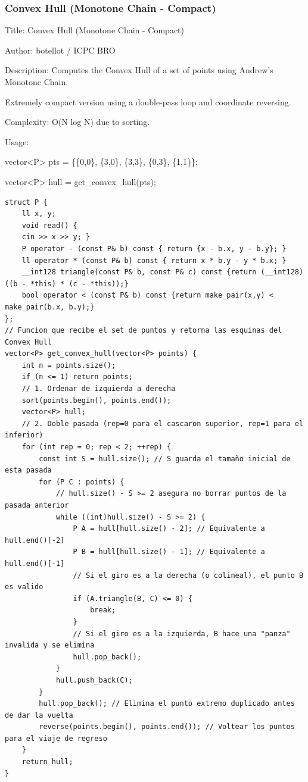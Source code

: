 \documentclass[10pt,landscape,twocolumn]{article}
\begin{document}
\subsubsection{Convex Hull (Monotone Chain - Compact)}
\begin{flushleft}
\footnotesize\ttfamily
\par\noindent Title: Convex Hull (Monotone Chain - Compact)
\par\noindent Author: botellot / ICPC BRO
\par\noindent Description: Computes the Convex Hull of a set of points using Andrew's Monotone Chain.
\par\noindent Extremely compact version using a double-pass loop and coordinate reversing.
\par\noindent Complexity: O(N log N) due to sorting.
\par\noindent Usage:
\par\noindent vector\textless{}P\textgreater{} pts = \{\{0,0\}, \{3,0\}, \{3,3\}, \{0,3\}, \{1,1\}\};
\par\noindent vector\textless{}P\textgreater{} hull = get\_convex\_hull(pts);
\end{flushleft}

\begin{lstlisting}
struct P {
    ll x, y;
    void read() { 
    cin >> x >> y; }
    P operator - (const P& b) const { return {x - b.x, y - b.y}; }
    ll operator * (const P& b) const { return x * b.y - y * b.x; }
    __int128 triangle(const P& b, const P& c) const {return (__int128)((b - *this) * (c - *this));}
    bool operator < (const P& b) const {return make_pair(x,y) < make_pair(b.x, b.y);}
};
// Funcion que recibe el set de puntos y retorna las esquinas del Convex Hull
vector<P> get_convex_hull(vector<P> points) {
    int n = points.size();
    if (n <= 1) return points;
    // 1. Ordenar de izquierda a derecha
    sort(points.begin(), points.end()); 
    vector<P> hull;
    // 2. Doble pasada (rep=0 para el cascaron superior, rep=1 para el inferior)
    for (int rep = 0; rep < 2; ++rep) {
        const int S = hull.size(); // S guarda el tamaño inicial de esta pasada
        for (P C : points) {
            // hull.size() - S >= 2 asegura no borrar puntos de la pasada anterior
            while ((int)hull.size() - S >= 2) {
                P A = hull[hull.size() - 2]; // Equivalente a hull.end()[-2]
                P B = hull[hull.size() - 1]; // Equivalente a hull.end()[-1]
                // Si el giro es a la derecha (o colineal), el punto B es valido
                if (A.triangle(B, C) <= 0) { 
                    break;
                }
                // Si el giro es a la izquierda, B hace una "panza" invalida y se elimina
                hull.pop_back(); 
            }
            hull.push_back(C);
        }
        hull.pop_back(); // Elimina el punto extremo duplicado antes de dar la vuelta
        reverse(points.begin(), points.end()); // Voltear los puntos para el viaje de regreso
    }
    return hull;
}
\end{lstlisting}
\end{document}
